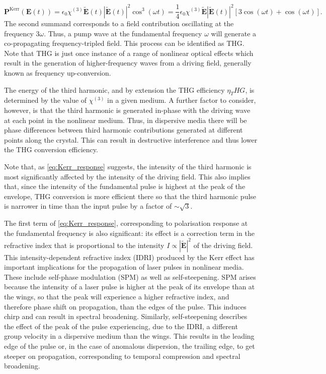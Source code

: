 \documentclass[a4paper]{jpconf}
\begin{document}
\begin{equation}\label{eq:Kerr_response}
\mathbf{P}^\text{Kerr}(\mathbf{E}(t)) = \epsilon_0 \chi^{(3)} \tilde{\mathbf{E}}(t)|\tilde{\mathbf{E}}(t)|^2 \cos^3(\omega t) =\frac{1}{4} \epsilon_0 \chi^{(3)}  \tilde{\mathbf{E}} |\tilde{\mathbf{E}}(t)|^2 \left[  3 \cos(\omega t) + \cos (\omega t) \right].
\end{equation}
The second summand corresponds to a field contribution oscillating at the frequency $3 \omega$. Thus, a pump wave at the fundamental frequency $\omega$ will generate a co-propagating frequency-tripled field. This process can be identified as THG. Note that THG is just once instance of a range of nonlinear optical effects which result in the generation of higher-frequency waves from a driving field, generally known as frequency up-conversion. \par 
The energy of the third harmonic, and by extension the THG efficiency $\eta_THG$, is determined by the value of $\chi^{(3)}$ in a given medium. A further factor to consider, however, is that the third harmonic is generated in-phase with the driving wave at each point in the nonlinear medium. Thus, in dispersive media there will be phase differences between third harmonic contributions generated at different points along the crystal. This can result in destructive interference and thus lower the THG conversion efficiency. \par 
Note that, as \eqref{eq:Kerr_response} suggests, the intensity of the third harmonic is most significantly affected by the intensity of the driving field. This also implies that, since the intensity of the fundamental pulse is highest at the peak of the envelope, THG conversion is more efficient there so that the third harmonic pulse is narrower in time than the input pulse by a factor of $\sim\sqrt{3}$. \par 
The first term of \eqref{eq:Kerr_response}, corresponding to polarisation response at the fundamental frequency is also significant: its effect is a correction term in the refractive index that is proportional to the intensity $I \propto|\tilde{\mathbf{E}}|^2$ of the driving field. This intensity-dependent refractive index (IDRI) produced by the Kerr effect has important implications for the propagation of laser pulses in nonlinear media. These include self-phase modulation (SPM) as well as self-steepening. SPM arises because the intensity of a laser pulse is higher at the peak of its envelope than at the wings, so that the peak will experience a higher refractive index, and therefore phase shift on propagation, than the edges of the pulse. This induces chirp and can result in spectral broadening. Similarly, self-steepening describes the effect of the peak of the pulse experiencing, due to the IDRI, a different group velocity in a dispersive medium than the wings. This results in the leading edge of the pulse or, in the case of anomalous dispersion, the trailing edge, to get steeper on propagation, corresponding to temporal compression and spectral broadening. \par 
\end{document}
